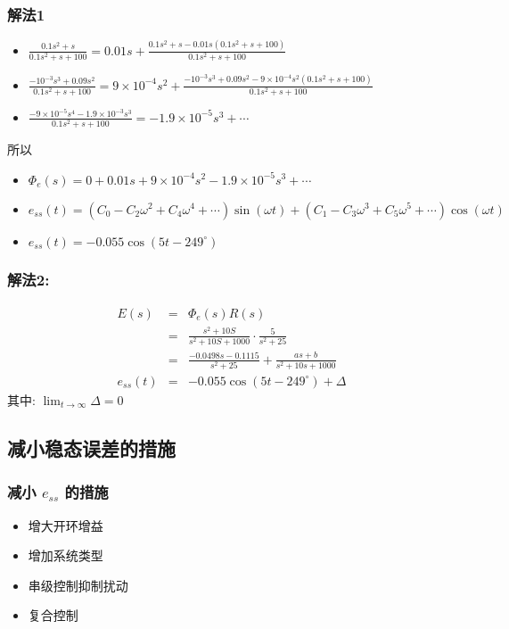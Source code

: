 \documentclass{article}
\begin{document}
\begin{frame}
\frametitle{解法1}
\label{sec-3-3-8}





\begin{itemize}
\item $\frac{0.1s^2+s}{0.1s^2+s+100}  =0.01s+\frac{0.1s^2+s-0.01s(0.1s^2+s+100)}{0.1s^2+s+100}$
\item $\frac{-10^{-3}s^3+0.09s^2}{0.1s^2+s+100} = 9\times 10^{-4}s^2+\frac{-10^{-3}s^3+0.09s^2-9\times 10^{-4}s^2(0.1s^2+s+100)}{0.1s^2+s+100}$
\item $\frac{-9\times 10^{-5}s^4-1.9\times 10^{-3}s^3}{0.1s^2+s+100}  = -1.9\times 10^{-5}s^3 + \cdots$
\end{itemize}
所以
\begin{itemize}
\item $\Phi_e(s) = 0+0.01s+9\times 10^{-4}s^2-1.9\times 10^{-5}s^3+\cdots$
\item $e_{ss}(t) = (C_0-C_2\omega^2+C_4\omega^4+\cdots)\sin(\omega t)+(C_1-C_3\omega^3+C_5\omega^5+\cdots)\cos(\omega t)$
\item $e_{ss}(t) = -0.055\cos(5t-249^{\circ})$
\end{itemize}
\end{frame}
\begin{frame}
\frametitle{解法2:}
\label{sec-3-3-9}

\begin{eqnarray*}
E(s) & = & \Phi_e(s)R(s) \\
     &=& \frac{s^2+10S}{s^2+10S+1000}\cdot\frac{5}{s^2+25}\\
     &=&\frac{-0.0498s-0.1115}{s^2+25}+\frac{as+b}{s^2+10s+1000}\\
e_{ss}(t)&=& -0.055\cos(5t-249^{\circ})+\Delta 
\end{eqnarray*}
其中: $\lim_{t\rightarrow\infty}\Delta = 0$
\end{frame}
\subsection{减小稳态误差的措施}
\label{sec-3-4}
\begin{frame}
\frametitle{减小 $e_{ss}$ 的措施}
\label{sec-3-4-1}

\begin{itemize}
\item <2->增大开环增益
\item <3->增加系统类型
\item <4->串级控制抑制扰动
\item <5->复合控制
\end{itemize}
\end{frame}
\end{document}
